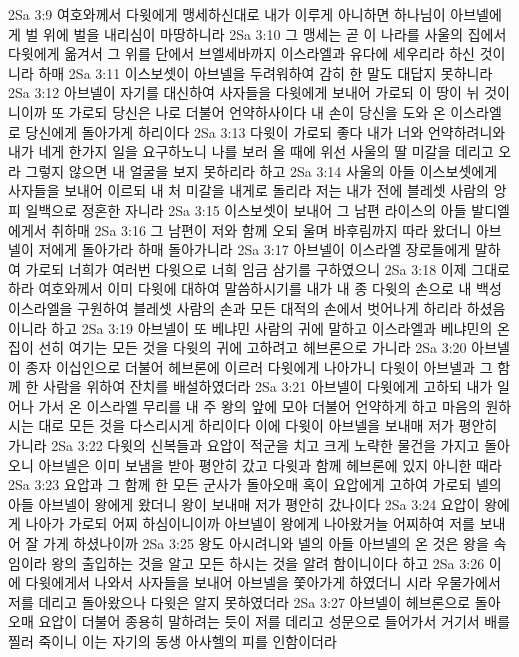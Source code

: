 2Sa 3:9  여호와께서 다윗에게 맹세하신대로 내가 이루게 아니하면 하나님이 아브넬에게 벌 위에 벌을 내리심이 마땅하니라
2Sa 3:10  그 맹세는 곧 이 나라를 사울의 집에서 다윗에게 옮겨서 그 위를 단에서 브엘세바까지 이스라엘과 유다에 세우리라 하신 것이니라 하매
2Sa 3:11  이스보셋이 아브넬을 두려워하여 감히 한 말도 대답지 못하니라
2Sa 3:12  아브넬이 자기를 대신하여 사자들을 다윗에게 보내어 가로되 이 땅이 뉘 것이니이까 또 가로되 당신은 나로 더불어 언약하사이다 내 손이 당신을 도와 온 이스라엘로 당신에게 돌아가게 하리이다
2Sa 3:13  다윗이 가로되 좋다 내가 너와 언약하려니와 내가 네게 한가지 일을 요구하노니 나를 보러 올 때에 위선 사울의 딸 미갈을 데리고 오라 그렇지 않으면 내 얼굴을 보지 못하리라 하고
2Sa 3:14  사울의 아들 이스보셋에게 사자들을 보내어 이르되 내 처 미갈을 내게로 돌리라 저는 내가 전에 블레셋 사람의 앙피 일백으로 정혼한 자니라
2Sa 3:15  이스보셋이 보내어 그 남편 라이스의 아들 발디엘에게서 취하매
2Sa 3:16  그 남편이 저와 함께 오되 울며 바후림까지 따라 왔더니 아브넬이 저에게 돌아가라 하매 돌아가니라
2Sa 3:17  아브넬이 이스라엘 장로들에게 말하여 가로되 너희가 여러번 다윗으로 너희 임금 삼기를 구하였으니
2Sa 3:18  이제 그대로 하라 여호와께서 이미 다윗에 대하여 말씀하시기를 내가 내 종 다윗의 손으로 내 백성 이스라엘을 구원하여 블레셋 사람의 손과 모든 대적의 손에서 벗어나게 하리라 하셨음이니라 하고
2Sa 3:19  아브넬이 또 베냐민 사람의 귀에 말하고 이스라엘과 베냐민의 온집이 선히 여기는 모든 것을 다윗의 귀에 고하려고 헤브론으로 가니라
2Sa 3:20  아브넬이 종자 이십인으로 더불어 헤브론에 이르러 다윗에게 나아가니 다윗이 아브넬과 그 함께 한 사람을 위하여 잔치를 배설하였더라
2Sa 3:21  아브넬이 다윗에게 고하되 내가 일어나 가서 온 이스라엘 무리를 내 주 왕의 앞에 모아 더불어 언약하게 하고 마음의 원하시는 대로 모든 것을 다스리시게 하리이다 이에 다윗이 아브넬을 보내매 저가 평안히 가니라
2Sa 3:22  다윗의 신복들과 요압이 적군을 치고 크게 노략한 물건을 가지고 돌아오니 아브넬은 이미 보냄을 받아 평안히 갔고 다윗과 함께 헤브론에 있지 아니한 때라
2Sa 3:23  요압과 그 함께 한 모든 군사가 돌아오매 혹이 요압에게 고하여 가로되 넬의 아들 아브넬이 왕에게 왔더니 왕이 보내매 저가 평안히 갔나이다
2Sa 3:24  요압이 왕에게 나아가 가로되 어찌 하심이니이까 아브넬이 왕에게 나아왔거늘 어찌하여 저를 보내어 잘 가게 하셨나이까
2Sa 3:25  왕도 아시려니와 넬의 아들 아브넬의 온 것은 왕을 속임이라 왕의 출입하는 것을 알고 모든 하시는 것을 알려 함이니이다 하고
2Sa 3:26  이에 다윗에게서 나와서 사자들을 보내어 아브넬을 쫓아가게 하였더니 시라 우물가에서 저를 데리고 돌아왔으나 다윗은 알지 못하였더라
2Sa 3:27  아브넬이 헤브론으로 돌아오매 요압이 더불어 종용히 말하려는 듯이 저를 데리고 성문으로 들어가서 거기서 배를 찔러 죽이니 이는 자기의 동생 아사헬의 피를 인함이더라
